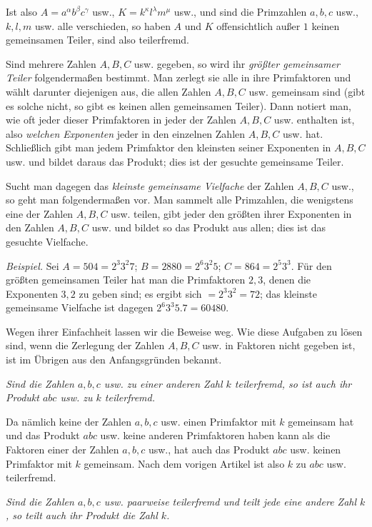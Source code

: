 Ist also $A=a^\alpha b^\beta c^\gamma$ usw., $K=k^\kappa l^\lambda m^{\mu}$ usw., und sind die Primzahlen $a, b, c$ usw., $k, l, m$ usw. alle verschieden, so haben $A$ und $K$ offensichtlich außer $1$ keinen gemeinsamen Teiler, sind also teilerfremd.

Sind mehrere Zahlen $A, B, C$ usw. gegeben, so wird ihr \emph{größter gemeinsamer Teiler} folgendermaßen bestimmt. Man zerlegt sie alle in ihre Primfaktoren und wählt darunter diejenigen aus, die allen Zahlen $A, B, C$ usw. gemeinsam sind (gibt es solche nicht, so gibt es keinen allen gemeinsamen Teiler). Dann notiert man, wie oft jeder dieser Primfaktoren in jeder der Zahlen $A, B, C$ usw. enthalten ist, also \emph{welchen Exponenten} jeder in den einzelnen Zahlen $A, B, C$ usw. hat. Schließlich gibt man jedem Primfaktor den kleinsten seiner Exponenten in $A, B, C$ usw. und bildet daraus das Produkt; dies ist der gesuchte gemeinsame Teiler.

Sucht man dagegen das \emph{kleinste gemeinsame Vielfache} der Zahlen $A, B, C$ usw., so geht man folgendermaßen vor. Man sammelt alle Primzahlen, die wenigstens eine der Zahlen $A, B, C$ usw. teilen, gibt jeder den größten ihrer Exponenten in den Zahlen $A, B, C$ usw. und bildet so das Produkt aus allen; dies ist das gesuchte Vielfache.

\emph{Beispiel.} Sei $A=504=2^3 3^2 7$; $B=2880=2^6 3^2 5$; $C=864=2^5 3^3$. Für den größten gemeinsamen Teiler hat man die Primfaktoren $2, 3$, denen die Exponenten $3, 2$ zu geben sind; es ergibt sich $=2^3 3^2=72$; das kleinste gemeinsame Vielfache ist dagegen $2^6 3^3 5.7=60480$.

Wegen ihrer Einfachheit lassen wir die Beweise weg. Wie diese Aufgaben zu lösen sind, wenn die Zerlegung der Zahlen $A, B, C$ usw. in Faktoren nicht gegeben ist, ist im Übrigen aus den Anfangsgründen bekannt.

\emph{Sind die Zahlen $a, b, c$ usw. zu einer anderen Zahl $k$ teilerfremd, so ist auch ihr Produkt $abc$ usw. zu $k$ teilerfremd.}

Da nämlich keine der Zahlen $a, b, c$ usw. einen Primfaktor mit $k$ gemeinsam hat und das Produkt $abc$ usw. keine anderen Primfaktoren haben kann als die Faktoren einer der Zahlen $a, b, c$ usw., hat auch das Produkt $abc$ usw. keinen Primfaktor mit $k$ gemeinsam. Nach dem vorigen Artikel ist also $k$ zu $abc$ usw. teilerfremd.

\emph{Sind die Zahlen $a, b, c$ usw. paarweise teilerfremd und teilt jede eine andere Zahl $k$, so teilt auch ihr Produkt die Zahl $k$.}

